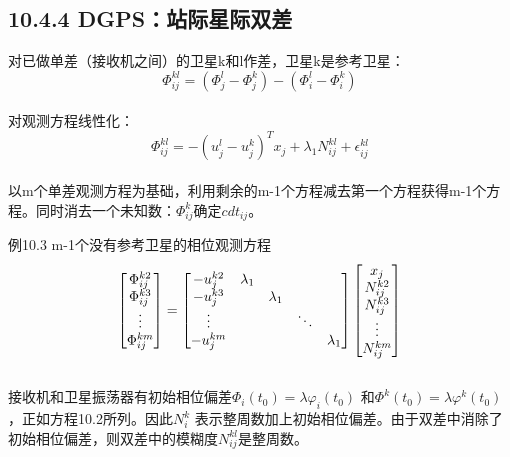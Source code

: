 \subsection{10.4.4 DGPS：站际星际双差}

对已做单差（接收机之间）的卫星k和l作差，卫星k是参考卫星：
\begin{equation}
	\Phi_{ij}^{kl}=(\Phi_{j}^{l}-\Phi_{j}^{k})-(\Phi_{i}^{l}-\Phi_{i}^{k})
\end{equation}\\
对观测方程线性化：
$$
\Phi_{ij}^{kl}=-(u_{j}^{l}-u_{j}^{k})^{T}x_{j}+\lambda_{1}N_{ij}^{kl}+\epsilon_{ij}^{kl}
$$\\
以m个单差观测方程为基础，利用剩余的m-1个方程减去第一个方程获得m-1个方程。同时消去一个未知数：$\Phi_{ij}^{k}$确定$cdt_{ij}$。

例10.3 m-1个没有参考卫星的相位观测方程
\begin{equation}
	\begin{bmatrix}
		\Phi_{ij}^{k2}\\
		\Phi_{ij}^{k3}\\
		\vdots \\
		\Phi_{ij}^{km}
	\end{bmatrix}
	=\begin{bmatrix}
		-u_{j}^{k2}&\lambda_{1}\\
		-u_{j}^{k3}&           &\lambda_{1}\\
		\vdots     &           &  &\ddots\\
		-u_{j}^{km} & &\multicolumn{2}{c}{\raisebox{1.3ex}[0pt]{\Huge}} & \lambda_{1}
	\end{bmatrix}
	\begin{bmatrix}
		x_{j}\\
		N_{ij}^{k2}\\
		N_{ij}^{k3}\\
		\vdots\\
		N_{ij}^{km}
	\end{bmatrix}
\end{equation}\\
接收机和卫星振荡器有初始相位偏差$\Phi_{i}(t_{0})=\lambda\varphi_{i}(t_{0})$ 和$\Phi^{k}(t_{0})=\lambda\varphi^{k}(t_{0})$，正如方程10.2所列。因此$N_{i}^{k}$ 表示整周数加上初始相位偏差。由于双差中消除了初始相位偏差，则双差中的模糊度$N_{ij}^{kl}$是整周数。

